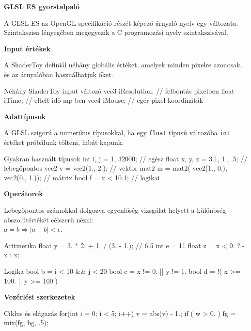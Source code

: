 



\begin{multicols*}{2}
{\Large \bf GLSL ES gyorstalpaló}

A GLSL ES az OpenGL specifikáció részét képező árnyaló nyelv egy változata.
Szintakszisa lényegében megegyezik a C programozási nyelv szintakszisával.

\textbf{Input értékek}

A ShaderToy definiál néhány globális értéket,
amelyek minden pixelre azonosak, és az árnyalóban használhatjuk őket.

\begin{glsl}{Néhány ShaderToy input változó}
vec3  iResolution; // felbontás pixelben
float iTime;       // eltelt idő mp-ben
vec4  iMouse;      // egér pixel koordináták
\end{glsl}
  
\textbf{Adattípusok}

A GLSL szigorú a numerikus típusokkal, ha egy \texttt{float} típusú változóba
\texttt{int} értéket próbálunk tölteni, hibát kapunk.

\begin{glsl}{Gyakran használt típusok}
int i, j = 1, 32000;         // egész
float x, y, z = 3.1, 1., .5; // lebegőpontos
vec2  v = vec2(1., 2.);      // vektor
mat2 m = mat2(
    vec2(1., 0.),
    vec2(0., 1.));           // mátrix
bool f = x < 10.1;           // logikai 
\end{glsl}

\textbf{Operátorok}

Lebegőpontos számokkal dolgozva egyenlőség
vizsgálat helyett a különbség abszolútértékét
célszerű nézni:\\ $ a = b \Rightarrow \mid a - b \mid < \epsilon$.

\begin{glsl}{Aritmetika}
float y = 3. * 2. + 1. / (3. - 1.); // 6.5
int   e = 11 %
float z = x < 0. ? -x : x;
\end{glsl}
    
\begin{glsl}{Logika}
bool b = i < 10 && j < 20
bool c = x != 0. || y != 1.
bool d = !( x >= 100. || y >= 100.)
\end{glsl}

\textbf{Vezérlési szerkezetek}
\begin{glsl}{Ciklus és elágazás}
for(int i = 0; i < 5; i++) {
    v = abs(v) - 1.;
}
if ( w > 0. ) { fg = mix(fg, bg, .5); }
\end{glsl}


\end{multicols*}
